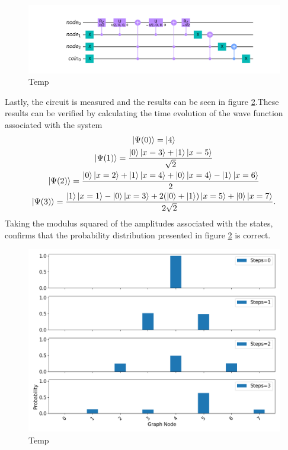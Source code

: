 \documentclass[../../dissertation.tex]{subfiles}
\begin{document}
\begin{figure}[!h]
	\centering
	\includegraphics[scale=0.35]{img/Qiskit/CoinedQuantumWalk/Circuits/circDecr_N3_S3.png}
	\caption{Temp} 
	\label{fig:decrCircuitQistkit}
\end{figure}
Lastly, the circuit is measured and the results can be seen in figure \ref{fig:coinedQWQiskitDist}.These results can be verified by calculating the time evolution of the wave function associated with the system
\begin{gather}
	\ket{\Psi(0)} = \ket{4}\\
	\ket{\Psi(1)} = \frac{\ket{0}\ket{x=3}+\ket{1}\ket{x=5}}{\sqrt{2}}\label{eq:10} \\
	\ket{\Psi(2)} = \frac{\ket{0}\ket{x=2}+\ket{1}\ket{x=4}+\ket{0}\ket{x=4}-\ket{1}\ket{x=6}}{2}\\ \label{eq:11}
	\ket{\Psi(3)} = \frac{\ket{1}\ket{x=1}-\ket{0}\ket{x=3}+2(\ket{0}+\ket{1})\ket{x=5}+\ket{0}\ket{x=7}}{2\sqrt{2}}.\label{eq:12}
\end{gather}
Taking the modulus squared of the amplitudes associated with the states, confirms that the probability distribution presented in figure \ref{fig:coinedQWQiskitDist} is correct. 
\begin{figure}[!h]
	\centering
	\includegraphics[scale=0.40]{img/Qiskit/CoinedQuantumWalk/CoinedQW_N3_S0123.png}
	\caption{Temp} 
	\label{fig:coinedQWQiskitDist}
\end{figure}
\end{document}
